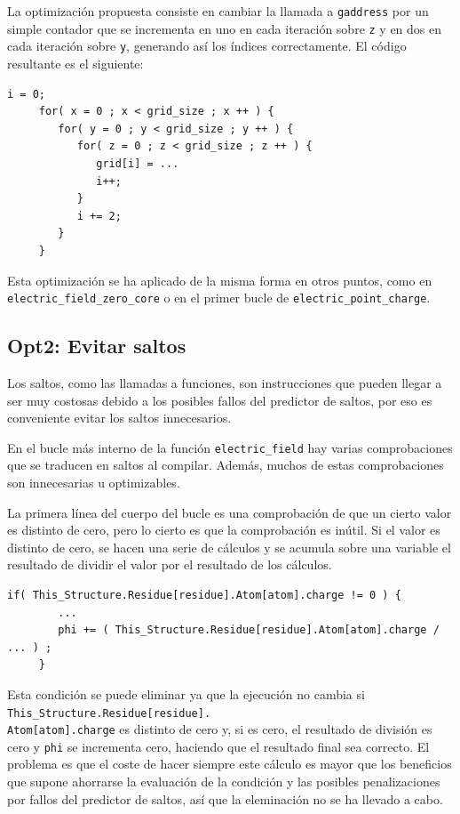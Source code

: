 La optimizaci\'{o}n propuesta consiste en cambiar la llamada a
\texttt{gaddress} por un simple contador que se incrementa en uno en cada
iteraci\'{o}n sobre \texttt{z} y en dos en cada iteraci\'{o}n sobre
\texttt{y}, generando as\'{i} los \'{i}ndices correctamente. El c\'{o}digo
resultante es el siguiente:

\begin{lstlisting}[]
     i = 0;
     for( x = 0 ; x < grid_size ; x ++ ) {
        for( y = 0 ; y < grid_size ; y ++ ) {
           for( z = 0 ; z < grid_size ; z ++ ) {
              grid[i] = ...
              i++;
           }
           i += 2;
        }
     }
\end{lstlisting}

Esta optimizaci\'{o}n se ha aplicado de la misma forma en otros puntos, como en
\texttt{electric\_field\_zero\_core} o en el primer bucle de
\texttt{electric\_point\_charge}.

\subsection{Opt2: Evitar saltos}

Los saltos, como las llamadas a funciones, son instrucciones que pueden llegar
a ser muy costosas debido a  los posibles fallos del predictor de saltos, por
eso es conveniente evitar los saltos innecesarios.

En el bucle m\'{a}s interno de la funci\'{o}n \texttt{electric\_field} hay
varias comprobaciones que se traducen en saltos al compilar. Adem\'{a}s, muchos
de estas comprobaciones son innecesarias u optimizables.

La primera l\'{i}nea del cuerpo del bucle es una comprobaci\'{o}n de que un
cierto valor es distinto de cero, pero lo cierto es que la comprobaci\'{o}n es
in\'{u}til. Si el valor es distinto de cero, se hacen una serie de c\'{a}lculos
y se acumula sobre una variable el resultado de dividir el valor por el
resultado de los c\'{a}lculos.

\begin{lstlisting}[]
     if( This_Structure.Residue[residue].Atom[atom].charge != 0 ) {
        ...
        phi += ( This_Structure.Residue[residue].Atom[atom].charge / ... ) ;
     }
\end{lstlisting}

Esta condici\'{o}n se puede eliminar ya que la ejecuci\'{o}n no cambia si
\texttt{This\_Structure.Residue[residue].\\Atom[atom].charge} es distinto de
cero y, si es cero, el resultado de divisi\'{o}n es cero y
\texttt{phi} se incrementa cero, haciendo que el resultado final sea correcto.
El problema es que el coste de hacer siempre este c\'{a}lculo es mayor que los
beneficios que supone ahorrarse la evaluaci\'{o}n de la condici\'{o}n y las
posibles penalizaciones 
por fallos del predictor de saltos, as\'{i} que la eleminaci\'{o}n no se ha
llevado a cabo.

